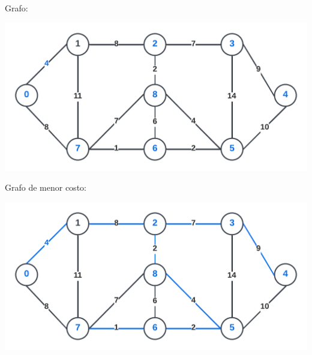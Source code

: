 \documentclass{report}
\begin{document}
Grafo:

\includegraphics[width=1\textwidth]{images/graph2.png}

Grafo de menor costo:

\includegraphics[width=1\textwidth]{images/graph3.png}
\end{document}
